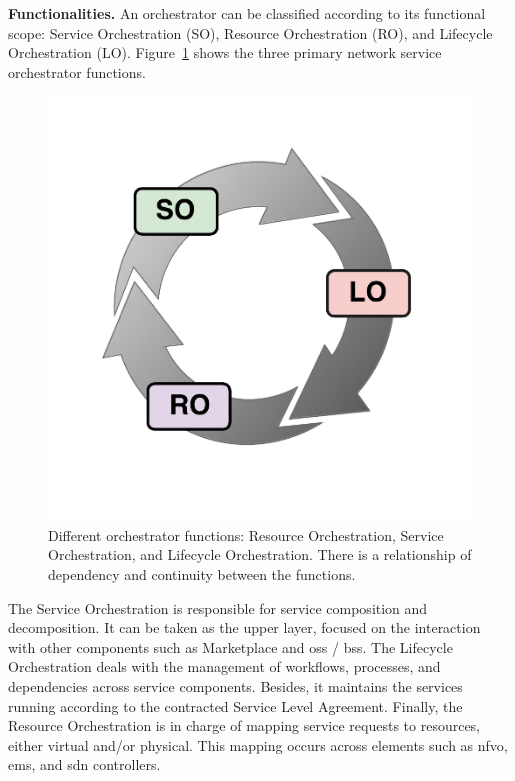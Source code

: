 \textbf{Functionalities.} An orchestrator can be classified according to its functional scope: Service Orchestration (SO), Resource Orchestration (RO), and Lifecycle Orchestration (LO). Figure~\ref{funOrch} shows the three primary network service orchestrator functions.

\begin{figure}[t!]
  \centering
  \includegraphics[scale=.35]{Figures/04_NSO/fun_orch}
    \caption{Different orchestrator functions: Resource Orchestration, Service Orchestration, and Lifecycle Orchestration. There is a relationship of dependency and continuity between the functions.}
    \label{funOrch}
\end{figure}

The Service Orchestration is responsible for service composition and decomposition. It can be taken as the upper layer, focused on the interaction with other components such as Marketplace and \gls{oss} / \gls{bss}. The Lifecycle Orchestration deals with the management of workflows, processes, and dependencies across service components. Besides, it maintains the services running according to the contracted Service Level Agreement. Finally, the Resource Orchestration is in charge of mapping service requests to resources, either virtual and/or physical. This mapping occurs across elements such as \gls{nfvo}, \gls{ems}, and \gls{sdn} controllers.



